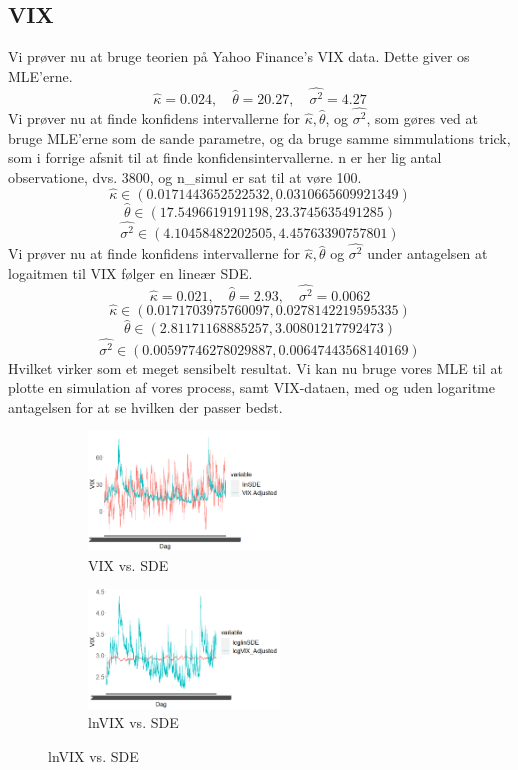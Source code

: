 \documentclass{article}
\theoremstyle{definition}
\theoremstyle{remark}
\begin{document}
\subsection{VIX}
Vi prøver nu at bruge teorien på Yahoo Finance's VIX data. Dette giver os MLE'erne.
$$\hat \kappa=0.024 ,\quad \hat \theta =20.27,\quad \hat{\sigma^2}= 4.27$$
Vi prøver nu at finde konfidens intervallerne for $\hat\kappa,\hat \theta$, og $\hat{\sigma^2}$, som gøres ved at bruge MLE'erne som de sande parametre, og da bruge samme simmulations trick, som i forrige afsnit til at finde konfidensintervallerne. n er her lig antal observatione, dvs. 3800, og n\_simul er sat til at vøre 100.
 $$\hat\kappa\in(0.0171443652522532,0.0310665609921349)$$
 $$\hat\theta\in(17.5496619191198 ,23.3745635491285)$$
 $$\hat{\sigma^2}\in(4.10458482202505,4.45763390757801)$$
Vi prøver nu at finde konfidens intervallerne for $\hat\kappa,\hat \theta$ og $\hat{\sigma^2}$ under antagelsen at logaitmen til VIX følger en lineær SDE.
$$\hat \kappa=0.021 ,\quad \hat \theta =2.93,\quad \hat{\sigma^2}= 0.0062$$
 $$\hat\kappa\in(0.0171703975760097,0.0278142219595335)$$
 $$\hat\theta\in(2.81171168885257 ,3.00801217792473)$$
 $$\hat{\sigma^2}\in(0.00597746278029887,0.00647443568140169)$$
Hvilket virker som et meget sensibelt resultat. Vi kan nu bruge vores MLE til at plotte en simulation af vores process, samt VIX-dataen, med og uden logaritme antagelsen for at se hvilken der passer bedst.
\begin{figure}
\centering
\begin{subfigure}{2in}
    \raggedright
    \includegraphics[width=2in]{Rplot27}
    \caption{VIX vs. SDE}
    \label{fig:VIX}
\end{subfigure}
\begin{subfigure}{2in}
    \raggedleft
    \includegraphics[width=2in]{Rplot28}
    \caption{lnVIX vs. SDE}
    \label{fig:logVIX}
\end{subfigure}
\end{figure}
\end{document}
